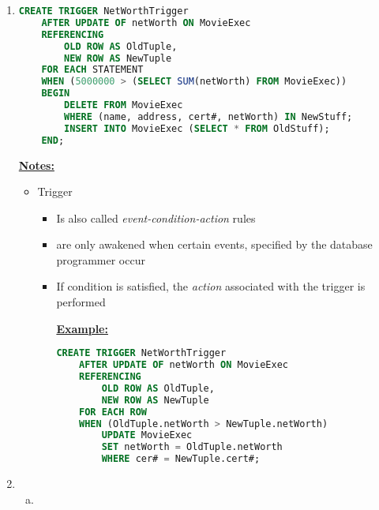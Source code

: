 \documentclass[12pt]{article}
\begin{document}
\begin{enumerate}[1.]
\begin{mdframed}
    \end{mdframed}

    \item

    \begin{lstlisting}[language=SQL]
    CREATE TRIGGER NetWorthTrigger
    AFTER UPDATE OF netWorth ON MovieExec
    REFERENCING
        OLD ROW AS OldTuple,
        NEW ROW AS NewTuple
    FOR EACH STATEMENT
    WHEN (5000000 > (SELECT SUM(netWorth) FROM MovieExec))
    BEGIN
        DELETE FROM MovieExec
        WHERE (name, address, cert#, netWorth) IN NewStuff;
        INSERT INTO MovieExec (SELECT * FROM OldStuff);
    END;
    \end{lstlisting}

    \bigskip

    \underline{\textbf{Notes:}}

    \bigskip

    \begin{itemize}
        \item Trigger
        \begin{itemize}
            \item Is also called \textit{event-condition-action} rules
            \item are only awakened when certain events, specified by the database
            programmer occur
            \item If condition is satisfied, the \textit{action} associated with the trigger
            is performed

            \bigskip

            \underline{\textbf{Example:}}

            \bigskip

    \begin{lstlisting}[language=SQL]
    CREATE TRIGGER NetWorthTrigger
    AFTER UPDATE OF netWorth ON MovieExec
    REFERENCING
        OLD ROW AS OldTuple,
        NEW ROW AS NewTuple
    FOR EACH ROW
    WHEN (OldTuple.netWorth > NewTuple.netWorth)
        UPDATE MovieExec
        SET netWorth = OldTuple.netWorth
        WHERE cer# = NewTuple.cert#;
    \end{lstlisting}

        \end{itemize}
    \end{itemize}

    \item

    \begin{enumerate}[a)]
        \item


\end{enumerate}
\end{enumerate}
\end{document}

